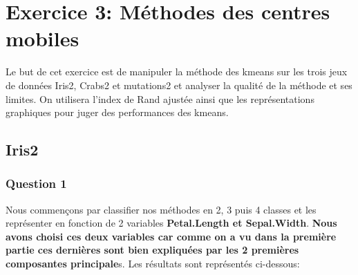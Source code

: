 \documentclass[10pt]{article}
\begin{document}
	\section{ Exercice 3: Méthodes des centres mobiles}
	Le but de cet exercice est de manipuler la méthode des kmeans sur les trois jeux de données Iris2, Crabs2 et mutations2 et analyser la qualité de la méthode et ses limites. On utilisera l'index de Rand ajustée ainsi que les représentations graphiques pour juger des performances des kmeans.
	\subsection{Iris2}
	\subsubsection{Question 1}
	Nous commençons par classifier nos méthodes en 2, 3 puis 4 classes et les représenter  en fonction de 2 variables \textbf{Petal.Length et Sepal.Width}. \textbf{Nous avons choisi ces deux variables  car comme on a vu dans la première partie ces dernières sont bien expliquées par les 2 premières composantes principale}s.  Les résultats sont représentés ci-dessous:\\
	
\end{document}
